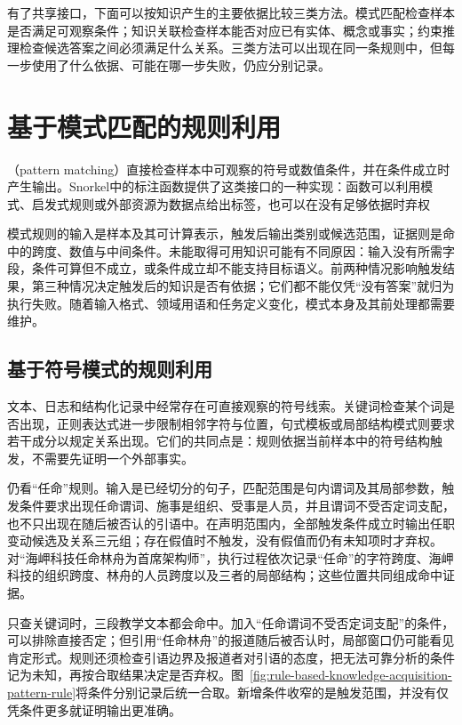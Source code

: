 有了共享接口，下面可以按知识产生的主要依据比较三类方法。模式匹配检查样本是否满足可观察条件；知识关联检查样本能否对应已有实体、概念或事实；约束推理检查候选答案之间必须满足什么关系。三类方法可以出现在同一条规则中，但每一步使用了什么依据、可能在哪一步失败，仍应分别记录。

\Needspace{85mm}
\section{基于模式匹配的规则利用}
\label{sec:rule-based-knowledge-acquisition-pattern}

（pattern matching）直接检查样本中可观察的符号或数值条件，并在条件成立时产生输出。Snorkel中的标注函数提供了这类接口的一种实现：函数可以利用模式、启发式规则或外部资源为数据点给出标签，也可以在没有足够依据时弃权

模式规则的输入是样本及其可计算表示，触发后输出类别或候选范围，证据则是命中的跨度、数值与中间条件。未能取得可用知识可能有不同原因：输入没有所需字段，条件可算但不成立，或条件成立却不能支持目标语义。前两种情况影响触发结果，第三种情况决定触发后的知识是否有依据；它们都不能仅凭“没有答案”就归为执行失败。随着输入格式、领域用语和任务定义变化，模式本身及其前处理都需要维护。

\subsection{基于符号模式的规则利用}
\label{sec:rule-based-knowledge-acquisition-symbolic-pattern}

文本、日志和结构化记录中经常存在可直接观察的符号线索。关键词检查某个词是否出现，正则表达式进一步限制相邻字符与位置，句式模板或局部结构模式则要求若干成分以规定关系出现。它们的共同点是：规则依据当前样本中的符号结构触发，不需要先证明一个外部事实。

仍看“任命”规则。输入是已经切分的句子，匹配范围是句内谓词及其局部参数，触发条件要求出现任命谓词、施事是组织、受事是人员，并且谓词不受否定词支配，也不只出现在随后被否认的引语中。在声明范围内，全部触发条件成立时输出任职变动候选及关系三元组；存在假值时不触发，没有假值而仍有未知项时才弃权。对“海岬科技任命林舟为首席架构师”，执行过程依次记录“任命”的字符跨度、海岬科技的组织跨度、林舟的人员跨度以及三者的局部结构；这些位置共同组成命中证据。

只查关键词时，三段教学文本都会命中。加入“任命谓词不受否定词支配”的条件，可以排除直接否定；但引用“任命林舟”的报道随后被否认时，局部窗口仍可能看见肯定形式。规则还须检查引语边界及报道者对引语的态度，把无法可靠分析的条件记为未知，再按合取结果决定是否弃权。图~\ref{fig:rule-based-knowledge-acquisition-pattern-rule}将条件分别记录后统一合取。新增条件收窄的是触发范围，并没有仅凭条件更多就证明输出更准确。

